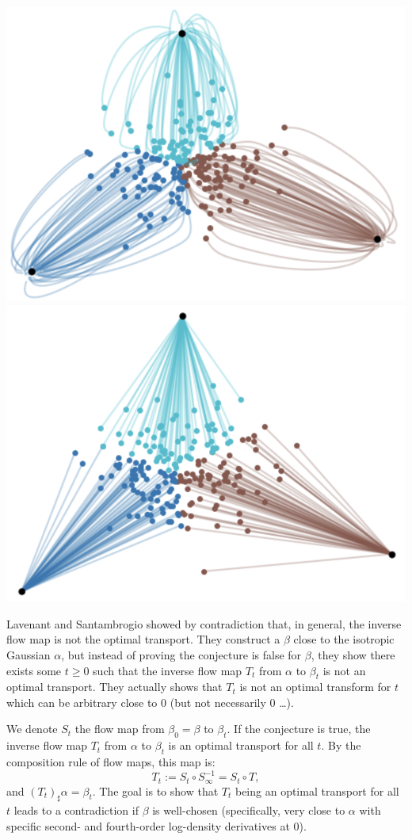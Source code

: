 \documentclass{article}
\begin{document}
\begin{center}
\includegraphics[width=.45\linewidth]{3-diracs-diffusion.png}\quad
\includegraphics[width=.45\linewidth]{3-diracs-ot.png}
\end{center}



Lavenant and Santambrogio showed by contradiction that, in general, the inverse flow map is not the optimal transport. They construct a $\beta$ close to the isotropic Gaussian $\alpha$, but instead of proving the conjecture is false for $\beta$, they show there exists some $t \geq 0$ such that the inverse flow map $T_t$ from $\alpha$ to $\beta_t$ is not an optimal transport. They actually shows that $T_t$ is not an optimal transform for $t$ which can be arbitrary close to 0 (but not necessarily 0 \ldots).

We denote $S_t$ the flow map from $\beta_0 = \beta$ to $\beta_t$. If the conjecture is true, the inverse flow map $T_t$ from $\alpha$ to $\beta_t$ is an optimal transport for all $t$. By the composition rule of flow maps, this map is:
\begin{equation}
    T_t := S_t \circ S_\infty^{-1} = S_t \circ T,
\end{equation}
and $(T_t)_\sharp \alpha = \beta_t$. The goal is to show that $T_t$ being an optimal transport for all $t$ leads to a contradiction if $\beta$ is well-chosen (specifically, very close to $\alpha$ with specific second- and fourth-order log-density derivatives at 0).
\end{document}
